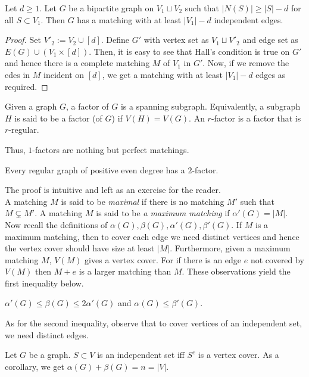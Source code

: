 \documentclass[../basic_graph_theory.tex]{subfiles}
\begin{document}
\begin{prop}
    Let $d \geq 1$. Let $G$ be a bipartite graph on $V_1 \sqcup V_2$ such that $|N(S)| \geq |S| - d$ for all $S \subset V_1$. Then $G$ has a matching with at least $|V_1| - d$ independent edges.
\end{prop}
\begin{proof}
    Set $V'_2 := V_2 \cup [d]$. Define $G'$ with vertex set as $V_1 \sqcup V'_2$ and edge set as $E(G) \cup (V_1 \times [d])$. Then, it is easy to see that Hall's condition is true on $G'$ and hence there is a complete matching $M$ of $V_1$ in $G'$. Now, if we remove the edes in $M$ incident on $[d]$, we get a matching with at least $|V_1| - d$ edges as required. 
\end{proof}
\begin{defn}
        Given a graph $G$,  a factor of $G$ is a spanning subgraph.  Equivalently,  a subgraph $H$ is said to be a factor (of $G$) if $V(H) = V(G)$. An $r$-factor is a factor that is $r$-regular. 
\end{defn}
Thus, $1$-factors are nothing but perfect matchings.
\begin{thm}[Petersen, 1891]
        Every regular graph of positive even degree has a $2$-factor.
\end{thm}
The proof is intuitive and left as an exercise for the reader.\\
A matching $M$ is said to be {\em maximal} if there is no matching $M'$ such that $M \subsetneq M'$.  A matching $M$ is said to be {\em a maximum matching} if $\alpha'(G) = |M|$.\\
Now recall the definitions of $\alpha(G), \beta(G), \alpha'(G), \beta'(G)$. If $M$ is a maximum matching, then to cover each edge we need distinct vertices and hence the vertex cover should have size at least $|M|$.  Furthermore,  given a maximum matching $M$,   $V(M)$ gives a vertex cover.   For if there is an edge $e$ not covered by $V(M)$ then $M+e$ is a larger matching than $M$.  These observations yield the first inequality below.\\
%
\begin{center}
$\alpha'(G) \leq  \beta(G) \leq 2 \alpha'(G)$ and $\alpha(G) \leq \beta'(G).$ \\
\end{center}
%
As for the second inequality, observe that to cover vertices of an independent set, we need distinct edges. 
%
\begin{lem}
Let $G$ be a graph. $S \subset V$ is an independent set iff $S^c$ is a vertex cover. As a corollary, we get $\alpha(G) + \beta(G) = n = |V|.$ 
\end{lem}
\end{document}
